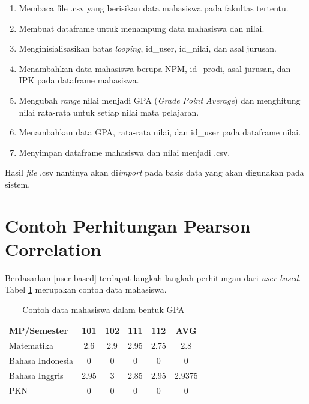 \begin{enumerate}
    \item Membaca file .csv yang berisikan data mahasiswa pada fakultas tertentu.
    
    \item Membuat dataframe untuk menampung data mahasiswa dan nilai.
    
    \item Menginisialisasikan batas \textit{looping}, id\_user, id\_nilai, dan asal jurusan.
    
    \item Menambahkan data mahasiswa berupa NPM, id\_prodi, asal jurusan, dan IPK pada dataframe mahasiswa.
    
    \item Mengubah \textit{range} nilai menjadi GPA (\textit{Grade Point Average}) dan menghitung nilai rata-rata untuk setiap nilai mata pelajaran.
    
    \item Menambahkan data GPA, rata-rata nilai, dan id\_user pada dataframe nilai.
    
    \item Menyimpan dataframe mahasiswa dan nilai menjadi .csv.
\end{enumerate}

Hasil \textit{file} .csv nantinya akan di\textit{import} pada basis data yang akan digunakan pada sistem.  

\section{Contoh Perhitungan Pearson Correlation}
Berdasarkan \ref{user-based} terdapat langkah-langkah perhitungan dari \textit{user-based}. Tabel \ref{tab:data mahasswa} merupakan contoh data mahasiswa.

\begin{table}[H]
    \centering
    \renewcommand{\arraystretch}{1.5}
    \begin{tabular}{|l|c|c|c|c|c|}
        \hline
        MP\slash Semester & 101 & 102 & 111 & 112 & AVG \\
        \hline 
        Matematika & 2.6 & 2.9 & 2.95 & 2.75 & 2.8 \\
        \hline 
        Bahasa Indonesia & 0 & 0 & 0 & 0 & 0 \\
        \hline 
        Bahasa Inggris & 2.95 & 3 & 2.85 & 2.95 & 2.9375 \\
        \hline 
        PKN & 0 & 0 & 0 & 0 & 0 \\
        \hline
    \end{tabular}
    \caption{Contoh data mahasiswa dalam bentuk GPA}
	\label{tab:data mahasswa}
\end{table}

